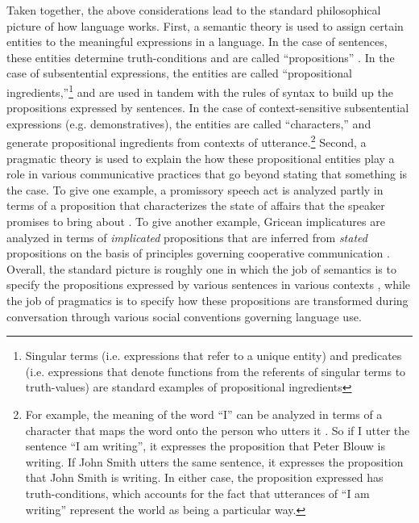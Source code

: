 Taken together, the above considerations lead to the standard philosophical picture of how language works. First, a semantic theory is used to assign certain entities to the meaningful expressions in a language. In the case of sentences, these entities determine truth-conditions and are called ``propositions'' \citep{Speaks:2014}. In the case of subsentential expressions, the entities are called ``propositional ingredients,''\footnote{Singular terms (i.e. expressions that refer to a unique entity) and predicates (i.e. expressions that denote functions from the referents of singular terms to truth-values) are standard examples of propositional ingredients} and are used in tandem with the rules of syntax to build up the propositions expressed by sentences. In the case of context-sensitive subsentential expressions (e.g. demonstratives), the entities are called ``characters,'' and generate propositional ingredients from contexts of utterance.\footnote{For example, the meaning of the word ``I'' can be analyzed in terms of a character that maps the word onto the person who utters it \citep{Stanley:2008}. So if I utter the sentence ``I am writing'', it expresses the proposition that Peter Blouw is writing. If John Smith utters the same sentence, it expresses the proposition that John Smith is writing. In either case, the proposition expressed has truth-conditions, which accounts for the fact that utterances of ``I am writing'' represent the world as being a particular way.} Second, a pragmatic theory is used to explain the how these propositional entities play a role in various communicative practices that go beyond stating that something is the case. To give one example, a promissory speech act is analyzed partly in terms of a proposition that characterizes the state of affairs that the speaker promises to bring about \citep{KortaPerry:2015}. To give another example, Gricean implicatures are analyzed in terms of \textit{implicated} propositions that are inferred from \textit{stated} propositions on the basis of principles governing cooperative communication \citep{Grice:1975,KortaPerry:2015}. Overall, the standard picture is roughly one in which the job of semantics is to specify the propositions expressed by various sentences in various contexts \citep{Soames:2010,Recanati:2012,CappelenLepore:2005}, while the job of pragmatics is to specify how these propositions are transformed during conversation through various social conventions governing language use. 

